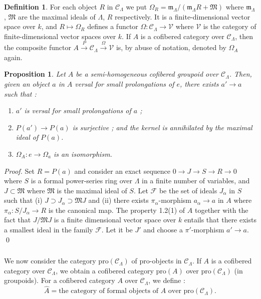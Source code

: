 \documentclass[11pt]{article}
\theoremstyle{plain}
\newtheorem{proposition}[theorem]{Proposition}
\theoremstyle{definition}
\newtheorem{definition}[theorem]{Definition}
\theoremstyle{remark}
\begin{document}
\begin{definition}
For each object $R$ in $\mathcal{C}_\Lambda$ we put $\Omega_R = \mathfrak{m}_\Lambda/(\mathfrak{m}_\Lambda R + \mathfrak{M})$ where $\mathfrak{m}_\Lambda$, $\mathfrak{M}$ are the maximal ideals of $\Lambda$, $R$ respectively. It is a finite-dimensional vector space over $k$, and $R \mapsto \Omega_R$ defines a functor $\Omega: \mathcal{C}_\Lambda \to \mathcal{V}$ where $\mathcal{V}$ is the category of finite-dimensional vector spaces over $k$. If $A$ is a cofibered category over $\mathcal{C}_\Lambda$, then the composite functor $A \xrightarrow{P} \mathcal{C}_\Lambda \xrightarrow{\Omega} \mathcal{V}$ is, by abuse of notation, denoted by $\Omega_A$ again.
\end{definition}

\begin{proposition}
Let $A$ be a semi-homogeneous cofibered groupoid over $\mathcal{C}_\Lambda$. Then, given an object $a$ in $A$ versal for small prolongations of $e$, there exists $a' \to a$ such that :
\begin{enumerate}[label=(\roman*)]
\item $a'$ is versal for small prolongations of $a$ ;
\item $P(a') \to P(a)$ is surjective ; and the kernel is annihilated by the maximal ideal of $P(a)$.
\item $\Omega_A: e \to \Omega_a$ is an isomorphism.
\end{enumerate}
\end{proposition}

\begin{proof}
Set $R = P(a)$ and consider an exact sequence $0 \to J \to S \to R \to 0$ where $S$ is a formal power-series ring over $\Lambda$ in a finite number of variables, and $J \subset \mathfrak{M}$ where $\mathfrak{M}$ is the maximal ideal of $S$. Let $\mathcal{F}$ be the set of ideals $J_\alpha$ in $S$ such that (i) $J \supset J_\alpha \supset \mathfrak{M}J$ and (ii) there exists $\pi_\alpha$-morphism $a_\alpha \to a$ in $A$ where $\pi_\alpha: S/J_\alpha \to R$ is the canonical map. The property 1.2(1) of $A$ together with the fact that $J/\mathfrak{M}J$ is a finite dimensional vector space over $k$ entails that there exists a smallest ideal in the family $\mathcal{F}$. Let it be $J'$ and choose a $\pi'$-morphism $a' \to a$.
\qed\end{proof}

\subsubsection{}
We now consider the category $\mathrm{pro}(\mathcal{C}_\Lambda)$ of pro-objects in $\mathcal{C}_\Lambda$. If $A$ is a cofibered category over $\mathcal{C}_\Lambda$, we obtain a cofibered category $\mathrm{pro}(A)$ over $\mathrm{pro}(\mathcal{C}_\Lambda)$ (in groupoids). For a cofibered category $A$ over $\mathcal{C}_\Lambda$, we define :
\[
\hat{A} = \text{the category of formal objects of } A \text{ over } \mathrm{pro}(\mathcal{C}_\Lambda).
\]
\end{document}

